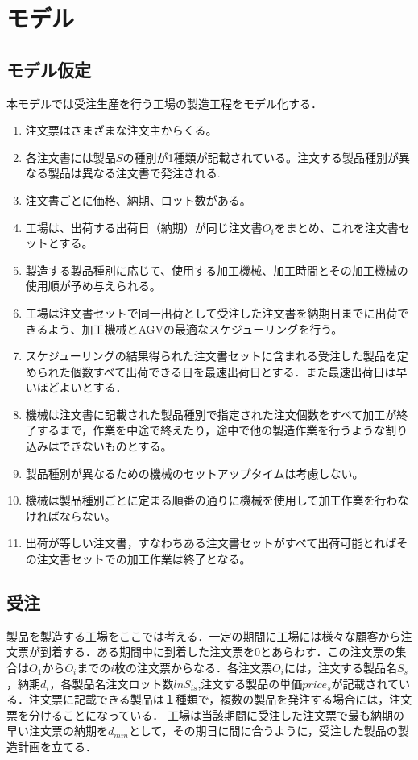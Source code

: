 \documentclass{jarticle}
\begin{document}
\section{モデル}
\subsection{モデル仮定}
本モデルでは受注生産を行う工場の製造工程をモデル化する．
\begin{enumerate}
    \item 注文票はさまざまな注文主からくる。
    \item 各注文書には製品$S$の種別が1種類が記載されている。注文する製品種別が異なる製品は異なる注文書で発注される.
    \item 注文書ごとに価格、納期、ロット数がある。
    \item 工場は、出荷する出荷日（納期）が同じ注文書$O_{\textit{i}}$をまとめ、これを注文書セットとする。
    \item 製造する製品種別に応じて、使用する加工機械、加工時間とその加工機械の使用順が予め与えられる。
    \item 工場は注文書セットで同一出荷として受注した注文書を納期日までに出荷できるよう、加工機械とAGVの最適なスケジューリングを行う。
    \item スケジューリングの結果得られた注文書セットに含まれる受注した製品を定められた個数すべて出荷できる日を最速出荷日とする．また最速出荷日は早いほどよいとする．
    \item 機械は注文書に記載された製品種別で指定された注文個数をすべて加工が終了するまで，作業を中途で終えたり，途中で他の製造作業を行うような割り込みはできないものとする。
    \item 製品種別が異なるための機械のセットアップタイムは考慮しない。
    \item 機械は製品種別ごとに定まる順番の通りに機械を使用して加工作業を行わなければならない。
    \item 出荷が等しい注文書，すなわちある注文書セットがすべて出荷可能とればその注文書セットでの加工作業は終了となる。
    \end{enumerate}

\subsection{受注}
製品を製造する工場をここでは考える．一定の期間に工場には様々な顧客から注文票が到着する．ある期間中に到着した注文票を$0$とあらわす．この注文票の集合は$O_1$から$O_i$までの$i$枚の注文票からなる．各注文票$O_i$には，注文する製品名$S_s$，納期$d_i$，各製品名注文ロット数$lnS_{is}$,注文する製品の単価$price_s$が記載されている．注文票に記載できる製品は１種類で，複数の製品を発注する場合には，注文票を分けることになっている．
工場は当該期間に受注した注文票で最も納期の早い注文票の納期を$d_{min}$として，その期日に間に合うように，受注した製品の製造計画を立てる．
\end{document}
